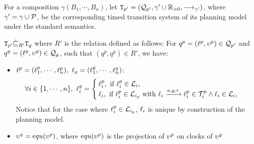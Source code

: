For a composition $\gamma(B_1,\cdots,B_n)$, let $\texttt{T}_{p'}=(\mathcal{Q}_{p'},\gamma'\cup\mathbb{R}_{> 0},
\longrightarrow_{\gamma'})$, where $\gamma'=\gamma\cup\mathcal{P}$, be the corresponding timed transition 
system of its planning model under the 
standard semantics.  
\begin{theorem}\label{correctness}
  $\texttt{T}_{p'}\dot{\sqsubseteq}_{R'}\texttt{T}_g$ where $R'$ is the relation defined as follows:
  For $q^p=(\ell^p,\upsilon^p)\in\mathcal{Q}_{p'}$ and $q^g=(\ell^g,\upsilon^g)\in\mathcal{Q}_g$, such that $(q^p,q^g)\in 
  R'$, we have: 

  \begin{itemize}
    \item $\loc^p=(\loc^p_1,\cdots,\loc^p_n),\ \loc_g=(\loc^g_1,\cdots,\loc^g_n)$:
      \[\forall i\in\{1,\cdots,n\},\ \loc^g_i=\begin{cases}
        \loc^p_i, \text{ if } \loc^p_i\in\Loc_i,\\
        \loc_i, \text{ if } \loc^p_i\in\Loc_{i_p}\text{ with }\loc_i\transit{a,g,r}\loc_i^p\in
        \T_i^p\wedge\loc_i\in\Loc_i,
    \end{cases} 
      \]
      Notice that for the case where $\ell_i^p\in\mathcal{L}_{i_p}$, $\ell_i$ is unique by 
      construction of the planning model.
    \item $\upsilon^g=equ(\upsilon^p)$, where $equ(\upsilon^p)$ is the projection of $\upsilon^p$ on clocks of 
      $\upsilon^g$ 
  \end{itemize}
 
  \end{theorem}
